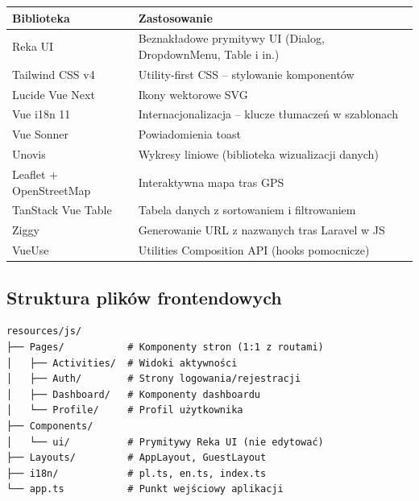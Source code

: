 \documentclass[12pt,a4paper]{report}
\begin{document}
\begin{center}
\begin{longtable}{|l|p{8cm}|}
\hline
\textbf{Biblioteka}       & \textbf{Zastosowanie}                              \\
\hline
Reka UI                   & Beznakładowe prymitywy UI (Dialog, DropdownMenu, Table i in.) \\
\hline
Tailwind CSS v4           & Utility-first CSS -- stylowanie komponentów       \\
\hline
Lucide Vue Next           & Ikony wektorowe SVG                               \\
\hline
Vue i18n 11               & Internacjonalizacja -- klucze tłumaczeń w szablonach \\
\hline
Vue Sonner                & Powiadomienia toast                               \\
\hline
Unovis                    & Wykresy liniowe (biblioteka wizualizacji danych)  \\
\hline
Leaflet + OpenStreetMap   & Interaktywna mapa tras GPS                        \\
\hline
TanStack Vue Table        & Tabela danych z sortowaniem i filtrowaniem        \\
\hline
Ziggy                     & Generowanie URL z nazwanych tras Laravel w JS     \\
\hline
VueUse                    & Utilities Composition API (hooks pomocnicze)      \\
\hline
\end{longtable}
\end{center}

\subsection{Struktura plików frontendowych}

\begin{lstlisting}[caption=Struktura katalogu resources/js/]
resources/js/
├── Pages/           # Komponenty stron (1:1 z routami)
│   ├── Activities/  # Widoki aktywności
│   ├── Auth/        # Strony logowania/rejestracji
│   ├── Dashboard/   # Komponenty dashboardu
│   └── Profile/     # Profil użytkownika
├── Components/
│   └── ui/          # Prymitywy Reka UI (nie edytować)
├── Layouts/         # AppLayout, GuestLayout
├── i18n/            # pl.ts, en.ts, index.ts
└── app.ts           # Punkt wejściowy aplikacji
\end{lstlisting}
\end{document}

